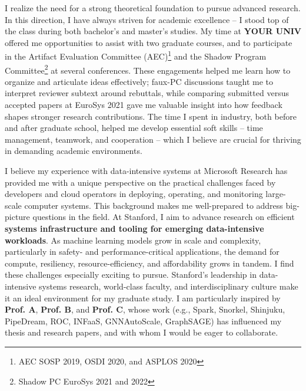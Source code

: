 \documentclass{article}
\newcommand{\schoolShort}{Stanford\xspace}
\newcommand{\profOne}{Prof. A\xspace}
\newcommand{\profTwo}{Prof. B\xspace}
\newcommand{\profThree}{Prof. C\xspace}
\begin{document}

I realize the need for a strong theoretical foundation to pursue advanced research. In this direction, I have always striven for academic excellence -- I stood top of the class during both bachelor's and master's studies.  
My time at \textbf{YOUR UNIV} offered me opportunities to assist with two graduate courses, and to participate in the Artifact Evaluation Committee (AEC)\footnote{AEC SOSP 2019, OSDI 2020, and ASPLOS 2020} and the Shadow Program Committee\footnote{Shadow PC EuroSys 2021 and 2022} at several conferences. These engagements helped me learn how to organize and articulate ideas effectively; faux-PC discussions taught me to interpret reviewer subtext around rebuttals, while comparing submitted versus accepted papers at EuroSys 2021 gave me valuable insight into how feedback shapes stronger research contributions.  
The time I spent in industry, both before and after graduate school, helped me develop essential soft skills -- time management, teamwork, and cooperation -- which I believe are crucial for thriving in demanding academic environments.

I believe my experience with data-intensive systems at Microsoft Research has provided me with a unique perspective on the practical challenges faced by developers and cloud operators in deploying, operating, and monitoring large-scale computer systems. This background makes me well-prepared to address big-picture questions in the field.  At \schoolShort, I aim to advance research on efficient \textbf{systems infrastructure and tooling for emerging data-intensive workloads}. As machine learning models grow in scale and complexity, particularly in safety- and performance-critical applications, the demand for compute, resiliency, resource-efficiency, and affordability grows in tandem. I find these challenges especially exciting to pursue. \schoolShort’s leadership in data-intensive systems research, world-class faculty, and interdisciplinary culture make it an ideal environment for my graduate study. I am particularly inspired by \textbf{\profOne}, \textbf{\profTwo}, and \textbf{\profThree}, whose work (e.g., Spark, Snorkel, Shinjuku, PipeDream, ROC, INFaaS, GNNAutoScale, GraphSAGE) has influenced my thesis and research papers, and with whom I would be eager to collaborate.
\end{document}

